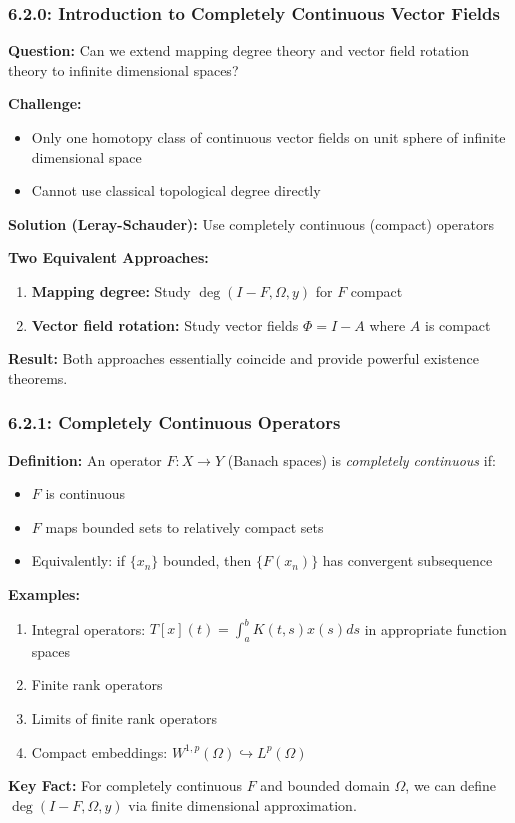 \documentclass[aspectratio=169,10pt]{beamer}
\begin{document}
\begin{frame}
\frametitle{6.2.0: Introduction to Completely Continuous Vector Fields}

\textbf{Question:} Can we extend mapping degree theory and vector field rotation theory to infinite dimensional spaces?

\vspace{0.3cm}
\textbf{Challenge:}
\begin{itemize}
    \item Only one homotopy class of continuous vector fields on unit sphere of infinite dimensional space
    \item Cannot use classical topological degree directly
\end{itemize}

\vspace{0.3cm}
\textbf{Solution (Leray-Schauder):} Use completely continuous (compact) operators

\vspace{0.3cm}
\textbf{Two Equivalent Approaches:}
\begin{enumerate}
    \item \textbf{Mapping degree:} Study $\deg(I - F, \Omega, y)$ for $F$ compact
    \item \textbf{Vector field rotation:} Study vector fields $\Phi = I - A$ where $A$ is compact
\end{enumerate}

\vspace{0.3cm}
\textbf{Result:} Both approaches essentially coincide and provide powerful existence theorems.
\end{frame}

\begin{frame}
\frametitle{6.2.1: Completely Continuous Operators}

\textbf{Definition:} An operator $F: X \to Y$ (Banach spaces) is \emph{completely continuous} if:
\begin{itemize}
    \item $F$ is continuous
    \item $F$ maps bounded sets to relatively compact sets
    \item Equivalently: if $\{x_n\}$ bounded, then $\{F(x_n)\}$ has convergent subsequence
\end{itemize}

\vspace{0.3cm}
\textbf{Examples:}
\begin{enumerate}
    \item Integral operators: $T[x](t) = \int_a^b K(t,s)x(s)ds$ in appropriate function spaces
    \item Finite rank operators
    \item Limits of finite rank operators
    \item Compact embeddings: $W^{1,p}(\Omega) \hookrightarrow L^p(\Omega)$
\end{enumerate}

\vspace{0.3cm}
\textbf{Key Fact:} For completely continuous $F$ and bounded domain $\Omega$, we can define $\deg(I - F, \Omega, y)$ via finite dimensional approximation.
\end{frame}
\end{document}
